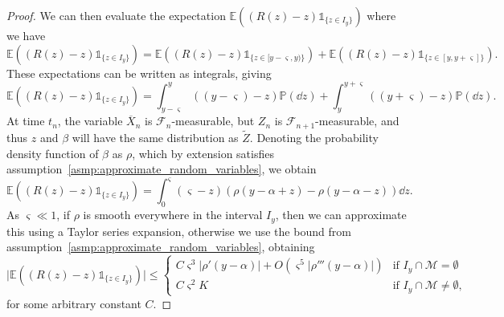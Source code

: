 \documentclass[9pt,a4paper,english]{extarticle}
\newcommand{\indicatorfn}{\mathds{1}}
\begin{document}
\begin{proof}
We can then evaluate the expectation $ \mathbb{E}((R(z) - z)\indicatorfn_{\{z \in I_y\}}) $ where we have 
\begin{equation*}
\mathbb{E}((R(z) - z)\indicatorfn_{\{z \in I_y\}}) 
= \mathbb{E}((R(z) - z)\indicatorfn_{\{z \in [y-\varsigma, y)\}}) 
+ \mathbb{E}((R(z) - z)\indicatorfn_{\{z \in [y, y+\varsigma]\}}).
\end{equation*}
These expectations can be written as integrals, giving
\begin{equation*}
\mathbb{E}((R(z) - z)\indicatorfn_{\{z \in I_y\}}) 
= \int_{y-\varsigma}^{y} ((y-\varsigma) - z) \mathbb{P}(\dd{z}) 
+ \int_{y}^{y+\varsigma} ((y+\varsigma) - z) \mathbb{P}(\dd{z}).
\end{equation*}
At time $ t_n $, the variable $ \overline{X}_n $ is $ \mathcal{F}_n $-measurable, but $ Z_n $ is $ \mathcal{F}_{n+1} $-measurable, and thus $ z $ and $ \beta $ will have the same distribution as $ \widetilde{Z} $. Denoting the probability density function of $ \beta $ as $ \rho $, which by extension satisfies assumption~\ref{asmp:approximate_random_variables}, we obtain
\begin{equation*}
\mathbb{E}((R(z) - z)\indicatorfn_{\{z \in I_y\}}) 
= \int_0^{\varsigma} (\varsigma - z) (\rho(y- \alpha + z) - \rho(y- \alpha -z)) \dd{z}.
\end{equation*}
As $ \varsigma \ll 1 $, if $ \rho $ is smooth everywhere in the interval $ I_y $, then we can approximate this using a Taylor series expansion, otherwise we use the bound from assumption~\ref{asmp:approximate_random_variables}, obtaining
\begin{equation*}
\lvert \mathbb{E}((R(z) - z)\indicatorfn_{\{z \in I_y\}}) \rvert 
\leq  \begin{cases}
C \varsigma^3 \lvert \rho'(y - \alpha)\rvert  + O(\varsigma^5 \lvert \rho'''(y-\alpha)\rvert )& \text{if } I_y \cap \mathcal{M} = \emptyset \\
C \varsigma^2 K & \text{if } I_y \cap \mathcal{M} \neq \emptyset,
\end{cases}
\end{equation*}
for some arbitrary constant $ C $.


\end{proof}
\end{document}
